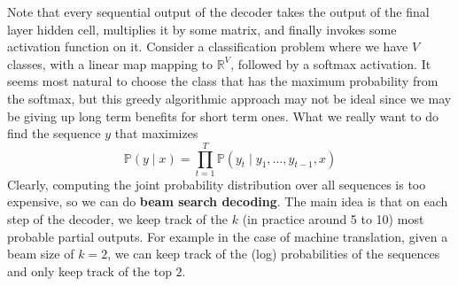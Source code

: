 \documentclass{article}
\theoremstyle{definition}
\theoremstyle{remark}
\theoremstyle{definition}
\begin{document}
Note that every sequential output of the decoder takes the output of the final layer hidden cell, multiplies it by some matrix, and finally invokes some activation function on it. Consider a classification problem where we have $V$ classes, with a linear map mapping to $\mathbb{R}^{V}$, followed by a softmax activation. It seems most natural to choose the class that has the maximum probability from the softmax, but this greedy algorithmic approach may not be ideal since we may be giving up long term benefits for short term ones. What we really want to do find the sequence $y$ that maximizes 
\[\mathbb{P}(y \mid x) = \prod_{t=1}^T \mathbb{P}( y_t \mid y_{1}, \ldots, y_{t-1}, x)\]
Clearly, computing the joint probability distribution over all sequences is too expensive, so we can do \textbf{beam search decoding}. The main idea is that on each step of the decoder, we keep track of the $k$ (in practice around 5 to 10) most probable partial outputs. For example in the case of machine translation, given a beam size of $k = 2$, we can keep track of the (log) probabilities of the sequences and only keep track of the top $2$. 
\end{document}
